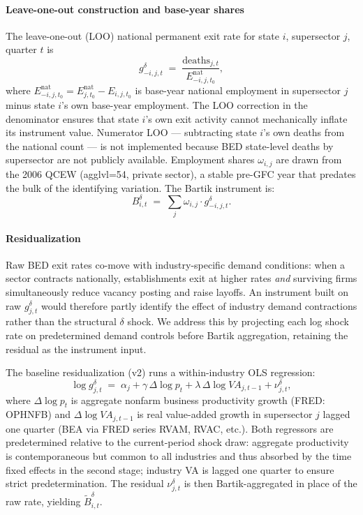 \documentclass[authoryear, review, 12pt]{elsarticle}
\begin{document}
	\paragraph{Leave-one-out construction and base-year shares}
	The leave-one-out (LOO) national permanent exit rate for state $i$,
	supersector $j$, quarter $t$ is
	\begin{equation}\label{eq:loo_rate}
		g^{\delta}_{-i,j,t}
		\;=\;
		\frac{\text{deaths}_{j,t}}
		     {E^{\text{nat}}_{-i,j,t_0}},
	\end{equation}
	where $E^{\text{nat}}_{-i,j,t_0}=E^{\text{nat}}_{j,t_0}-E_{i,j,t_0}$
	is base-year national employment in supersector $j$ minus state $i$'s
	own base-year employment.  The LOO correction in the denominator
	ensures that state $i$'s own exit activity cannot mechanically inflate
	its instrument value.  Numerator LOO --- subtracting state $i$'s own
	deaths from the national count --- is not implemented because
	BED state-level deaths by supersector are not publicly available.  Employment shares $\omega_{i,j}$ are drawn from the 2006
	QCEW (agglvl=54, private sector), a stable pre-GFC year that predates
	the bulk of the identifying variation.  The Bartik instrument is:
	\begin{equation}\label{eq:bartik_delta}
		B^{\delta}_{i,t}
		\;=\;
		\sum_{j} \omega_{i,j}\cdot g^{\delta}_{-i,j,t}.
	\end{equation}

	\paragraph{Residualization}
	Raw BED exit rates co-move with industry-specific demand conditions:
	when a sector contracts nationally, establishments exit at higher rates
	\emph{and} surviving firms simultaneously reduce vacancy posting and
	raise layoffs.  An instrument built on raw $g^\delta_{j,t}$ would
	therefore partly identify the effect of industry demand contractions
	rather than the structural $\delta$ shock.  We address this by
	projecting each log shock rate on predetermined demand controls before
	Bartik aggregation, retaining the residual as the instrument input.

	The baseline residualization (v2) runs a within-industry OLS regression:
	\begin{equation}\label{eq:resid_v2}
		\log g^{\delta}_{j,t}
		\;=\;
		\alpha_j + \gamma\,\Delta\!\log p_t
		         + \lambda\,\Delta\!\log VA_{j,t-1}
		         + \nu^{\delta}_{j,t},
	\end{equation}
	where $\Delta\!\log p_t$ is aggregate nonfarm business productivity
	growth (FRED: OPHNFB) and $\Delta\!\log VA_{j,t-1}$ is real
	value-added growth in supersector $j$ lagged one quarter (BEA via
	FRED series RVAM, RVAC, etc.).  Both regressors are predetermined
	relative to the current-period shock draw: aggregate productivity is
	contemporaneous but common to all industries and thus absorbed by the
	time fixed effects in the second stage; industry VA is lagged one
	quarter to ensure strict predetermination.  The residual
	$\nu^{\delta}_{j,t}$ is then Bartik-aggregated in place of the raw
	rate, yielding $\tilde{B}^{\delta}_{i,t}$.
\end{document}
